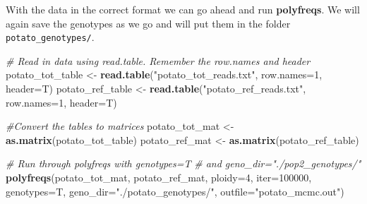 \documentclass[]{article}
\newenvironment{Shaded}{\begin{snugshade}}{\end{snugshade}}
\newcommand{\KeywordTok}[1]{\textcolor[rgb]{0.13,0.29,0.53}{\textbf{{#1}}}}
\newcommand{\DataTypeTok}[1]{\textcolor[rgb]{0.13,0.29,0.53}{{#1}}}
\newcommand{\DecValTok}[1]{\textcolor[rgb]{0.00,0.00,0.81}{{#1}}}
\newcommand{\StringTok}[1]{\textcolor[rgb]{0.31,0.60,0.02}{{#1}}}
\newcommand{\CommentTok}[1]{\textcolor[rgb]{0.56,0.35,0.01}{\textit{{#1}}}}
\newcommand{\NormalTok}[1]{{#1}}
\begin{document}
With the data in the correct format we can go ahead and run
\textbf{polyfreqs}. We will again save the genotypes as we go and will
put them in the folder \texttt{potato\_genotypes/}.

\begin{Shaded}
\begin{Highlighting}[]
\CommentTok{# Read in data using read.table. Remember the row.names and header}
\NormalTok{potato_tot_table <-}\StringTok{ }\KeywordTok{read.table}\NormalTok{(}\StringTok{"potato_tot_reads.txt"}\NormalTok{, }\DataTypeTok{row.names=}\DecValTok{1}\NormalTok{, }\DataTypeTok{header=}\NormalTok{T)}
\NormalTok{potato_ref_table <-}\StringTok{ }\KeywordTok{read.table}\NormalTok{(}\StringTok{"potato_ref_reads.txt"}\NormalTok{, }\DataTypeTok{row.names=}\DecValTok{1}\NormalTok{, }\DataTypeTok{header=}\NormalTok{T)}

\CommentTok{#Convert the tables to matrices}
\NormalTok{potato_tot_mat <-}\StringTok{ }\KeywordTok{as.matrix}\NormalTok{(potato_tot_table)}
\NormalTok{potato_ref_mat <-}\StringTok{ }\KeywordTok{as.matrix}\NormalTok{(potato_ref_table)}

\CommentTok{# Run through polyfreqs with genotypes=T}
\CommentTok{# and geno_dir="./pop2_genotypes/"}
\KeywordTok{polyfreqs}\NormalTok{(potato_tot_mat, potato_ref_mat, }\DataTypeTok{ploidy=}\DecValTok{4}\NormalTok{, }\DataTypeTok{iter=}\DecValTok{100000}\NormalTok{, }
          \DataTypeTok{genotypes=}\NormalTok{T, }\DataTypeTok{geno_dir=}\StringTok{"./potato_genotypes/"}\NormalTok{, }\DataTypeTok{outfile=}\StringTok{"potato_mcmc.out"}\NormalTok{)}
\end{Highlighting}
\end{Shaded}
\end{document}
